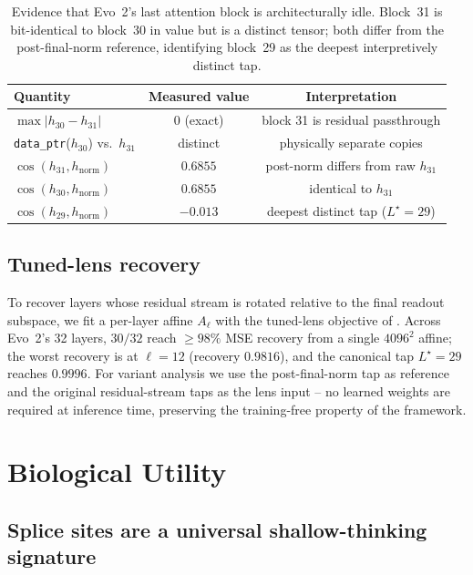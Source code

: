 \documentclass[12pt]{article}
\theoremstyle{plain}
\theoremstyle{definition}
\theoremstyle{remark}
\newcommand{\hnorm}{h_{\mathrm{norm}}}
\begin{document}
\begin{table}[t]
\caption{Evidence that Evo~2's last attention block is architecturally
idle. Block~31 is bit-identical to block~30 in value but is a distinct
tensor; both differ from the post-final-norm reference, identifying
block~29 as the deepest interpretively distinct tap.}
\label{tab:idle-block}
\centering
\small
\begin{tabular}{@{}lcc@{}}
\toprule
Quantity & Measured value & Interpretation \\
\midrule
$\max\bigl|h_{30}-h_{31}\bigr|$ & $0$ (exact) &
   block 31 is residual passthrough \\
\texttt{data\_ptr}($h_{30}$) vs.\ $h_{31}$ & distinct &
   physically separate copies \\
$\cos(h_{31}, \hnorm)$ & $0.6855$ &
   post-norm differs from raw $h_{31}$ \\
$\cos(h_{30}, \hnorm)$ & $0.6855$ &
   identical to $h_{31}$ \\
$\cos(h_{29}, \hnorm)$ & $-0.013$ &
   deepest distinct tap ($L^{\star}=29$) \\
\bottomrule
\end{tabular}
\end{table}

\subsection{Tuned-lens recovery}
\label{sec:tuned-lens}

To recover layers whose residual stream is rotated relative to the
final readout subspace, we fit a per-layer affine $A_{\ell}$ with the
tuned-lens objective of \citet{belrose2023tunedlens}. Across Evo~2's
32 layers, $30/32$ reach $\ge 98\%$ MSE recovery from a single
$4096^{2}$ affine; the worst recovery is at $\ell=12$ (recovery
$0.9816$), and the canonical tap $L^{\star}=29$ reaches $0.9996$. For
variant analysis we use the post-final-norm tap as reference and the
original residual-stream taps as the lens input -- no learned weights
are required at inference time, preserving the training-free property
of the framework.

\section{Biological Utility}
\label{sec:utility}

\subsection{Splice sites are a universal shallow-thinking signature}
\label{sec:splice}
\end{document}
